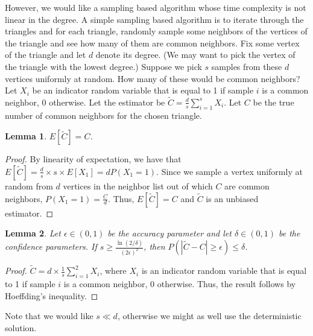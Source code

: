 \documentclass{article}
\newtheorem{lemma}{Lemma}
\begin{document}
However, we would like a sampling based 
algorithm whose time complexity is not linear in
the degree. A simple sampling based algorithm
is to iterate through the triangles and for each
triangle, randomly sample some neighbors of the
vertices of the triangle and see how many of
them are common  neighbors. Fix some vertex
of the triangle and let $d$ denote its degree. 
(We may want to pick the vertex of the triangle with
the lowest degree.)
Suppose we pick $s$ samples from these $d$ vertices
uniformly at random. How many of these would be
common  neighbors? Let $X_i$ be an indicator
random variable that is equal to 1 if sample $i$
is a common  neighbor, 0 otherwise. Let
the estimator be
$\tilde C = \frac{d}{s} \sum\limits_{i=1}^s X_i$.
Let $C$ be the true number of common  neighbors
for the chosen triangle.
% 
\begin{lemma}
$E[\tilde C] = C$.
\end{lemma}
\begin{proof}
By linearity of expectation, we have that
$E[\tilde C] = \frac{d}{s} \times s \times E[X_1] = 
d P(X_1 = 1)$. Since we sample a vertex uniformly
at random from $d$ vertices in the neighbor list out
of which $C$ are common  neighbors, $P(X_1 = 1)
=\frac{C}{d}$. Thus, $E[\tilde C] = C$ and $\tilde{C}$
is an unbiased estimator.
\end{proof}
\begin{lemma}
Let $\epsilon \in (0,1)$ be the accuracy parameter and
let $\delta \in (0,1)$ be the confidence parameters.
If $s \geq \frac{\ln(2/\delta)}{(2\epsilon)^2}$, then
$P(|\tilde C - C| \geq \epsilon) \leq \delta$.
\end{lemma}
\begin{proof}
$\tilde C = d \times \frac{1}{s} \sum\limits_{i=1}^2 X_i$,
where $X_i$ is an indicator random variable that is equal
to 1 if sample $i$ is a common  neighbor, 0 otherwise.
Thus, the result follows by Hoeffding's inequality.
\end{proof}
Note that we would like $s \ll d$, otherwise we might as
well use the deterministic solution.





\end{document}
